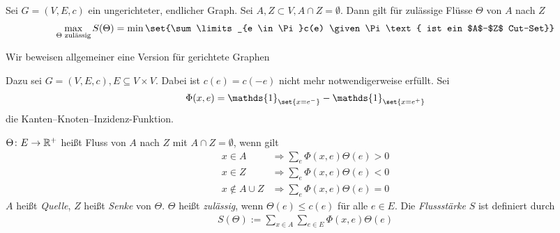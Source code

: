 \begin{satz}
	Sei $G = (V,E,c)$ ein ungerichteter, endlicher Graph. Sei $A,Z \subset V, A \cap Z = \emptyset$. Dann gilt für zulässige Flüsse $\Theta$ von $A$ nach $Z$
	\begin{align}
		\max\limits_{\Theta \text{ zulässig}} S(\Theta) = \min \set{\sum\limits_{e \in \Pi}c(e) \given \Pi \text{ ist ein $A$--$Z$ Cut--Set}}
	\end{align}
\end{satz}
Wir beweisen allgemeiner eine Version für gerichtete Graphen
\begin{beweis}
	Dazu sei $G = (V,E,c), E \subseteq V \times V$. Dabei ist $c(e) = c(-e)$ nicht mehr notwendigerweise erfüllt. Sei
	\begin{align}
		\Phi (x,e) = \mathds{1}_{\set{x = e^-}}- \mathds{1}_{\set{x = e^+}}
	\end{align}
	die Kanten--Knoten--Inzidenz-Funktion.

\end{beweis}
\begin{definition}
	$\Theta\colon E \to \mathbb{R}^+$ heißt Fluss von $A$ nach $Z$ mit $A \cap Z = \emptyset$, wenn gilt
	\begin{align}
		x \in A &\Rightarrow \sum\limits_{e} \Phi(x,e) \Theta(e) > 0 \\
		x \in Z &\Rightarrow \sum\limits_{e} \Phi(x,e) \Theta(e) < 0 \\
		x \notin A \cup Z &\Rightarrow \sum\limits_{e} \Phi(x,e) \Theta(e) = 0
	\end{align}
	$A$ heißt \emph{Quelle}, $Z$ heißt \emph{Senke} von $\Theta$. $\Theta$ heißt \emph{zulässig}, wenn $\Theta(e) \leq c(e)$ für alle $e \in E$. Die \emph{Flussstärke} $S$ ist definiert durch
	\begin{align}
		S(\Theta):= \sum\limits_{x \in A} \sum\limits_{e \in E} \Phi(x,e) \Theta(e)
	\end{align}
\end{definition}
	
